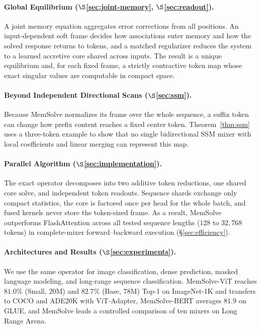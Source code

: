 \documentclass[10pt,twocolumn]{article}
\begin{document}
\paragraph{Global Equilibrium ($\S$\ref{sec:joint-memory}, $\S$\ref{sec:readout}).}
A joint memory equation aggregates error corrections from all positions.
An input-dependent soft frame decides how associations enter memory and how the
solved response returns to tokens, and a matched regularizer reduces the system
to a learned accretive core shared across inputs.
The result is a unique equilibrium and, for each fixed frame, a strictly
contractive token map whose exact singular values are computable in compact
space.

\paragraph{Beyond Independent Directional Scans ($\S$\ref{sec:ssm}).}
Because MemSolve normalizes its frame over the whole sequence, a suffix token
can change how prefix content reaches a fixed center token.
Theorem~\ref{thm:ssm} uses a three-token example to show that no single
bidirectional SSM mixer with local coefficients and linear merging can
represent this map.

\paragraph{Parallel Algorithm ($\S$\ref{sec:implementation}).}
The exact operator decomposes into two additive token reductions, one shared
core solve, and independent token readouts.
Sequence shards exchange only compact statistics, the core is factored once per
head for the whole batch, and fused kernels never store the token-sized frame.
As a result, MemSolve outperforms FlashAttention across all tested sequence
lengths ($128$ to $32{,}768$ tokens) in complete-mixer forward--backward
execution (\S\ref{sec:efficiency}).

\paragraph{Architectures and Results ($\S$\ref{sec:experiments}).}
We use the same operator for image classification, dense prediction, masked
language modeling, and long-range sequence classification.
MemSolve-ViT reaches $81.0\%$ (Small, $20$M) and $82.7\%$ (Base, $78$M) Top-1
on ImageNet-1K and transfers to COCO and ADE20K with ViT-Adapter, MemSolve-BERT
averages $81.9$ on GLUE, and MemSolve leads a controlled comparison of ten
mixers on Long Range Arena.
\end{document}
